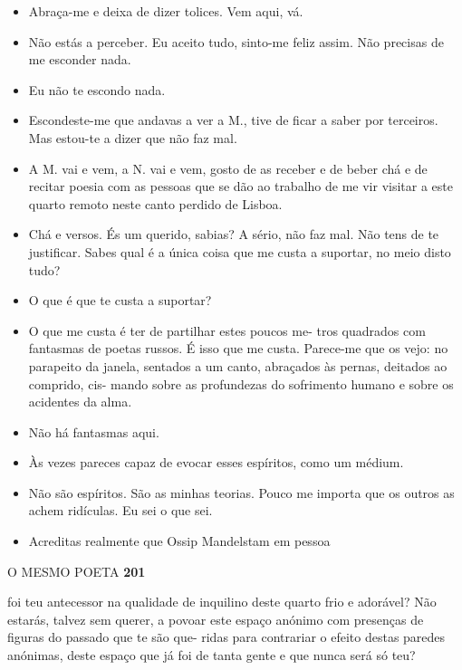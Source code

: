 \begin{itemize}
\tightlist
\item
  Abraça-me e deixa de dizer tolices. Vem aqui, vá.
\item
  Não estás a perceber. Eu aceito tudo, sinto-me feliz assim. Não
  precisas de me esconder nada.
\item
  Eu não te escondo nada.
\item
  Escondeste-me que andavas a ver a M., tive de ficar a saber por
  terceiros. Mas estou-te a dizer que não faz mal.
\item
  A M. vai e vem, a N. vai e vem, gosto de as receber e de beber chá e
  de recitar poesia com as pessoas que se dão ao trabalho de me vir
  visitar a este quarto remoto neste canto perdido de Lisboa.
\item
  Chá e versos. És um querido, sabias? A sério, não faz mal. Não tens de
  te justificar. Sabes qual é a única coisa que me custa a suportar, no
  meio disto tudo?
\item
  O que é que te custa a suportar?
\item
  O que me custa é ter de partilhar estes poucos me- tros quadrados com
  fantasmas de poetas russos. É isso que me custa. Parece-me que os
  vejo: no parapeito da janela, sentados a um canto, abraçados às
  pernas, deitados ao comprido, cis- mando sobre as profundezas do
  sofrimento humano e sobre os acidentes da alma.
\item
  Não há fantasmas aqui.
\item
  Às vezes pareces capaz de evocar esses espíritos, como um médium.
\item
  Não são espíritos. São as minhas teorias. Pouco me importa que os
  outros as achem ridículas. Eu sei o que sei.
\item
  Acreditas realmente que Ossip Mandelstam em pessoa
\end{itemize}

O MESMO POETA \textbf{201}

foi teu antecessor na qualidade de inquilino deste quarto frio e
adorável? Não estarás, talvez sem querer, a povoar este espaço anónimo
com presenças de figuras do passado que te são que- ridas para
contrariar o efeito destas paredes anónimas, deste espaço que já foi de
tanta gente e que nunca será só teu?

